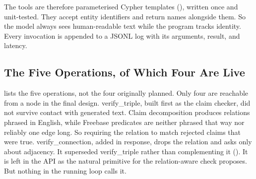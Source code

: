 The tools are therefore parameterised Cypher templates
(), written once and unit-tested. They accept entity
identifiers and return names alongside them. So the model always sees
human-readable text while the program tracks identity. Every invocation is
appended to a JSONL log with its arguments, result, and latency.

\subsection{The Five Operations, of Which Four Are
Live}\label{sec:five-operations}

 lists the five operations, not the four originally planned.
Only four are reachable from a node in the final design.
\textsf{verify\_triple}, built first as the claim checker, did not survive
contact with generated text. Claim decomposition produces relations phrased in
English, while Freebase predicates are neither phrased that way nor reliably one
edge long. So requiring the relation to match rejected claims that were true.
\textsf{verify\_connection}, added in response, drops the relation
and asks only about adjacency. It superseded \textsf{verify\_triple} rather than
complementing it (). It is left in the API as the
natural primitive for the relation-aware check  proposes. But
nothing in the running loop calls it.

